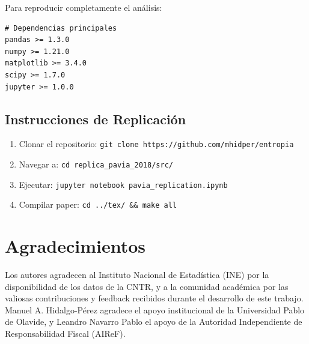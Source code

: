\documentclass[12pt,a4paper]{article}
\begin{document}
Para reproducir completamente el análisis:

\begin{verbatim}
# Dependencias principales
pandas >= 1.3.0
numpy >= 1.21.0
matplotlib >= 3.4.0
scipy >= 1.7.0
jupyter >= 1.0.0
\end{verbatim}

\subsection{Instrucciones de Replicación}

\begin{enumerate}
\item Clonar el repositorio: \texttt{git clone https://github.com/mhidper/entropia}
\item Navegar a: \texttt{cd replica\_pavia\_2018/src/}
\item Ejecutar: \texttt{jupyter notebook pavia\_replication.ipynb}
\item Compilar paper: \texttt{cd ../tex/ \&\& make all}
\end{enumerate}

\section*{Agradecimientos}

Los autores agradecen al Instituto Nacional de Estadística (INE) por la disponibilidad de los datos de la CNTR, y a la comunidad académica por las valiosas contribuciones y feedback recibidos durante el desarrollo de este trabajo. Manuel A. Hidalgo-Pérez agradece el apoyo institucional de la Universidad Pablo de Olavide, y Leandro Navarro Pablo el apoyo de la Autoridad Independiente de Responsabilidad Fiscal (AIReF).



\end{document}

